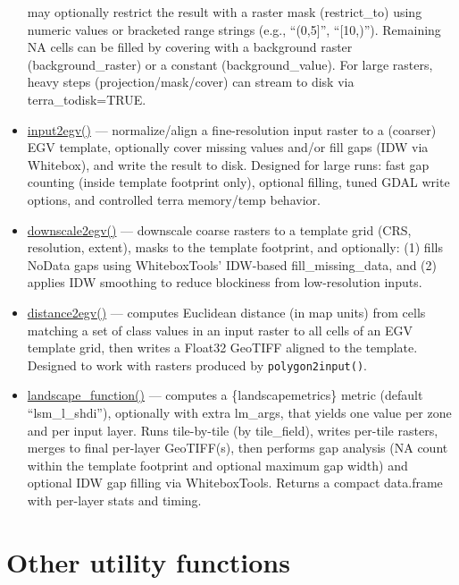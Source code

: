 \documentclass[
]{book}
\newcommand{\passthrough}[1]{#1}
\begin{document}
\begin{itemize}
  may optionally restrict the result with a raster mask (restrict\_to) using numeric
  values or bracketed range strings (e.g., ``(0,5{]}'', ``{[}10,)''). Remaining NA cells
  can be filled by covering with a background raster (background\_raster) or a
  constant (background\_value). For large rasters, heavy steps (projection/mask/cover)
  can stream to disk via terra\_todisk=TRUE.
\item
  \href{https://aavotins.github.io/egvtools/reference/input2egv.html}{input2egv()} --- normalize/align
  a fine-resolution input raster to a (coarser) EGV template, optionally cover missing values and/or fill gaps (IDW via Whitebox), and write the result to disk. Designed for large runs: fast gap counting (inside template footprint only), optional filling, tuned GDAL write options, and controlled terra memory/temp behavior.
\item
  \href{}{downscale2egv()} --- downscale coarse rasters to a template grid (CRS,
  resolution, extent), masks to the template footprint, and optionally: (1) fills
  NoData gaps using WhiteboxTools' IDW-based fill\_missing\_data, and (2) applies
  IDW smoothing to reduce blockiness from low-resolution inputs.
\item
  \href{https://aavotins.github.io/egvtools/reference/distance2egv.html}{distance2egv()} --- computes
  Euclidean distance (in map units) from cells matching a set of class values in
  an input raster to all cells of an EGV template grid, then writes a Float32
  GeoTIFF aligned to the template. Designed to work with rasters produced
  by \passthrough{\lstinline!polygon2input()!}.
\item
  \href{https://aavotins.github.io/egvtools/reference/landscape_function.html}{landscape\_function()} --- computes a \{landscapemetrics\} metric (default ``lsm\_l\_shdi''), optionally with extra lm\_args,
  that yields one value per zone and per input layer. Runs tile-by-tile (by
  tile\_field), writes per-tile rasters, merges to final per-layer GeoTIFF(s),
  then performs gap analysis (NA count within the template footprint and optional
  maximum gap width) and optional IDW gap filling via WhiteboxTools. Returns a
  compact data.frame with per-layer stats and timing.
\end{itemize}

\section{Other utility functions}\label{Ch02.02}
\end{document}
